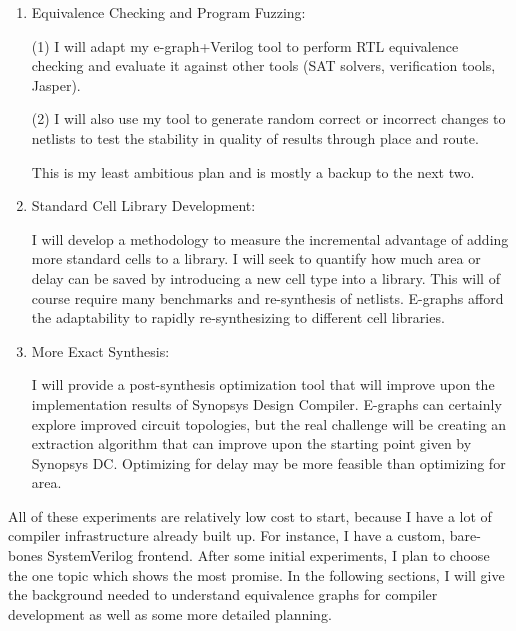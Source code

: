 \documentclass[10pt,letterpaper]{article}
\begin{document}
\begin{enumerate}
    \item Equivalence Checking and Program Fuzzing:

          \hspace{2em}\begin{minipage}{0.8\linewidth}
              (1) I will adapt my e-graph+Verilog tool to perform RTL equivalence checking and evaluate it against other tools (SAT solvers, verification tools, Jasper).

              (2) I will also use my tool to generate random correct or incorrect changes to netlists to test the stability in quality of results through place and route.

              This is my least ambitious plan and is mostly a backup to the next two.
          \end{minipage}

    \item Standard Cell Library Development:

          \hspace{2em}\begin{minipage}{0.8\linewidth}
              I will develop a methodology to measure the incremental advantage of adding more standard cells to a library.
              I will seek to quantify how much area or delay can be saved by introducing a new cell type into a library. This will of course require many benchmarks and re-synthesis of netlists.
              E-graphs afford the adaptability to rapidly re-synthesizing to different cell libraries.
          \end{minipage}

    \item More Exact Synthesis:

          \hspace{2em}\begin{minipage}{0.8\linewidth}
              I will provide a post-synthesis optimization tool that will improve upon the implementation results of Synopsys Design Compiler.
              E-graphs can certainly explore improved circuit topologies, but the real challenge will be creating an extraction algorithm that can improve upon the starting point given by Synopsys DC.
              Optimizing for delay may be more feasible than optimizing for area.
          \end{minipage}
\end{enumerate}

All of these experiments are relatively low cost to start, because I have a lot
of compiler infrastructure already built up. For instance, I have a custom,
bare-bones SystemVerilog frontend. After some initial experiments, I plan to
choose the one topic which shows the most promise. In the following sections, I
will give the background needed to understand equivalence graphs for compiler
development as well as some more detailed planning.
\end{document}
